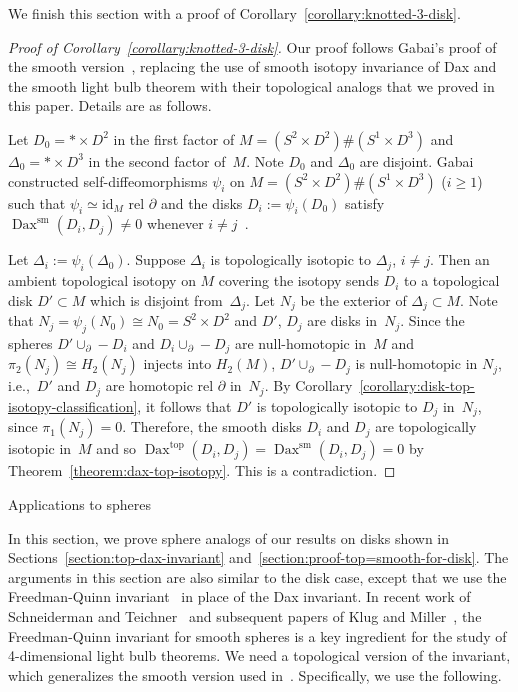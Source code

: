 \documentclass[11pt]{amsart}
\makeatletter
\def\section{\@startsection{section}{1}%
  \z@{-1.4\linespacing\@plus-.5\linespacing}{.8\linespacing}%
  {\normalfont\bfseries\Large\raggedright}}
\theoremstyle{definition}
\theoremstyle{theorem-giventitle}
\theoremstyle{definition-giventitle}
\numberwithin{equation}{section}
\def\id{\mathrm{id}}
\def\sm{\mathrm{sm}}
\def\top{\mathrm{top}}
\def\Dax{\operatorname{Dax}}
\makeatother
\begin{document}
We finish this section with a proof of Corollary~\ref{corollary:knotted-3-disk}.

\begin{proof}[Proof of Corollary~\ref{corollary:knotted-3-disk}]
  Our proof follows Gabai's proof of the smooth version~\cite[Proof of Theorem~5.1]{Gabai:2021-1}, replacing the use of smooth isotopy invariance of Dax and the smooth light bulb theorem with their topological analogs that we proved in this paper.
  Details are as follows.

  Let $D_0=*\times D^2$ in the first factor of $M=(S^2\times D^2)\#(S^1\times D^3)$ and $\Delta_0=*\times D^3$ in the second factor of~$M$.
  Note $D_0$ and $\Delta_0$ are disjoint.
  Gabai constructed self-diffeomorphisms $\psi_i$ on $M=(S^2\times D^2)\#(S^1\times D^3)$ ($i\ge 1$) such that $\psi_i\simeq \id_M$ rel $\partial$ and the disks $D_i := \psi_i(D_0)$ satisfy $\Dax^\sm(D_i,D_j)\ne 0$ whenever $i\ne j$~\cite[Lemma~5.3 and Proof of Theorem~5.1]{Gabai:2021-1}.

  Let $\Delta_i := \psi_i(\Delta_0)$.
  Suppose $\Delta_i$ is topologically isotopic to $\Delta_j$, $i\ne j$.
  Then an ambient topological isotopy on $M$ covering the isotopy sends $D_i$ to a topological disk $D'\subset M$ which is disjoint from~$\Delta_j$.
  Let $N_j$ be the exterior of $\Delta_j \subset M$.
  Note that $N_j=\psi_j(N_0) \cong N_0= S^2\times D^2$ and $D'$, $D_j$ are disks in~$N_j$.
  Since the spheres $D'\cup_\partial -D_i$ and $D_i\cup_\partial -D_j$ are null-homotopic in~$M$ and $\pi_2(N_j)\cong H_2(N_j)$ injects into $H_2(M)$, $D'\cup_\partial -D_j$ is null-homotopic in $N_j$, i.e.,\ $D'$ and $D_j$ are homotopic rel $\partial$ in~$N_j$.
  By Corollary~\ref{corollary:disk-top-isotopy-classification}, it follows that $D'$ is topologically isotopic to $D_j$ in~$N_j$, since $\pi_1(N_j)=0$.
  Therefore, the smooth disks $D_i$ and $D_j$ are topologically isotopic in~$M$ and so $\Dax^\top(D_i,D_j) = \Dax^\sm(D_i,D_j)=0$ by Theorem~\ref{theorem:dax-top-isotopy}.
  This is a contradiction.
\end{proof}



\section{Applications to spheres}
\label{section:application-to-spheres}

In this section, we prove sphere analogs of our results on disks shown in Sections~\ref{section:top-dax-invariant} and~\ref{section:proof-top=smooth-for-disk}.
The arguments in this section are also similar to the disk case, except that we use the Freedman-Quinn invariant~\cite{Freedman-Quinn:1990-1,Stong:1993-1} in place of the Dax invariant.
In recent work of Schneiderman and Teichner~\cite{Schneiderman-Teichner:2022-1} and subsequent papers of Klug and Miller~\cite{Klug-Miller:2021-1,Klug-Miller:2022-1}, 
the Freedman-Quinn invariant for smooth spheres is a key ingredient for the study of 4-dimensional light bulb theorems.
We need a topological version of the invariant, which generalizes the smooth version used in~\cite{Schneiderman-Teichner:2022-1,Klug-Miller:2021-1,Klug-Miller:2022-1}.
Specifically, we use the following.
\end{document}
